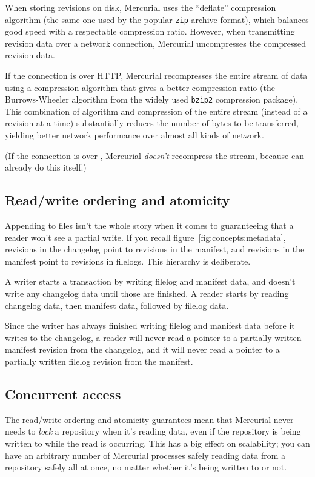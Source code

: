 When storing revisions on disk, Mercurial uses the ``deflate''
compression algorithm (the same one used by the popular \texttt{zip}
archive format), which balances good speed with a respectable
compression ratio.  However, when transmitting revision data over a
network connection, Mercurial uncompresses the compressed revision
data.

If the connection is over HTTP, Mercurial recompresses the entire
stream of data using a compression algorithm that gives a better
compression ratio (the Burrows-Wheeler algorithm from the widely used
\texttt{bzip2} compression package).  This combination of algorithm
and compression of the entire stream (instead of a revision at a time)
substantially reduces the number of bytes to be transferred, yielding
better network performance over almost all kinds of network.

(If the connection is over , Mercurial \emph{doesn't}
recompress the stream, because  can already do this
itself.)

\subsection{Read/write ordering and atomicity}

Appending to files isn't the whole story when it comes to guaranteeing
that a reader won't see a partial write.  If you recall
figure~\ref{fig:concepts:metadata}, revisions in the changelog point to
revisions in the manifest, and revisions in the manifest point to
revisions in filelogs.  This hierarchy is deliberate.

A writer starts a transaction by writing filelog and manifest data,
and doesn't write any changelog data until those are finished.  A
reader starts by reading changelog data, then manifest data, followed
by filelog data.

Since the writer has always finished writing filelog and manifest data
before it writes to the changelog, a reader will never read a pointer
to a partially written manifest revision from the changelog, and it will
never read a pointer to a partially written filelog revision from the
manifest.

\subsection{Concurrent access}

The read/write ordering and atomicity guarantees mean that Mercurial
never needs to \emph{lock} a repository when it's reading data, even
if the repository is being written to while the read is occurring.
This has a big effect on scalability; you can have an arbitrary number
of Mercurial processes safely reading data from a repository safely
all at once, no matter whether it's being written to or not.

